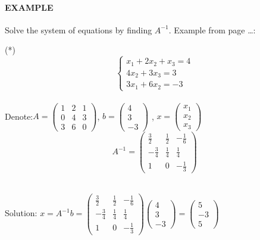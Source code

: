 \documentclass[]{article}
\let\oldparagraph\paragraph
\renewcommand{\paragraph}[1]{\oldparagraph{#1}\mbox{}}
\begin{document}
\paragraph{\texorpdfstring{EXAMPLE\\
}{EXAMPLE }}\label{example-13}

Solve the system of equations by finding \(A^{-1}\). Example from page
\ldots{}:

(*)
\[\begin{cases} x_1 + 2x_2 +x_3= 4\\ 4x_2 + 3x_3 = 3\\3x_1 + 6x_2 = -3 \end{cases}\]\\[2\baselineskip]Denote:\(A=\begin{pmatrix} 1 & 2 & 1\\ 0 & 4 & 3 \\ 3 & 6 & 0\end{pmatrix}\),
\(b=\begin{pmatrix} 4\\ 3 \\-3\end{pmatrix}\) ,
\(x=\begin{pmatrix} x_1\\ x_2 \\x_3\end{pmatrix}\)\\

\[A^{-1}=\begin{pmatrix} \frac{3}{2}&   \frac{1}{2} &   -\frac{1}{6}\\ -\frac{3}{4} &   \frac{1}{4} &   \frac{1}{4} \\ 1 &   0 &   -\frac{1}{3} \end{pmatrix}\]\\
 \hspace{3cm}

Solution:
\(x=A^{-1}b=\begin{pmatrix} \frac{3}{2}& \frac{1}{2} & -\frac{1}{6}\\ -\frac{3}{4} & \frac{1}{4} & \frac{1}{4} \\ 1 & 0 & -\frac{1}{3} \end{pmatrix}\)\(\begin{pmatrix} 4\\ 3\\ -3 \end{pmatrix}=\begin{pmatrix} 5\\ -3\\ 5 \end{pmatrix}\)\\
 \newpage
\end{document}
